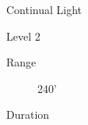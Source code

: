 \documentclass{article}
\begin{document}
\flushleft\aunclfamily{}

{\Huge Continual Light}

Level 2

\begin{description}
\item[Range] 240'
\item[Duration] 
\end{description}

\lipsum[2-3]
\end{document}
